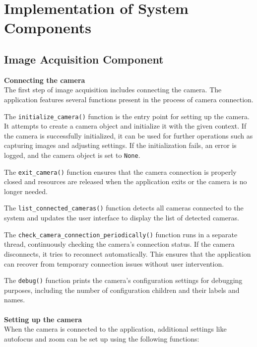 \section{Implementation of System Components}

\subsection{Image Acquisition Component}
\textbf{Connecting the camera}
\\
The first step of image acquisition includes connecting the camera. The application features several functions present in the process of camera connection.

The \texttt{initialize\_camera()} function is the entry point for setting up the camera. It attempts to create a camera object and initialize it with the given context. If the camera is successfully initialized, it can be used for further operations such as capturing images and adjusting settings. If the initialization fails, an error is logged, and the camera object is set to \texttt{None}.

The \texttt{exit\_camera()} function ensures that the camera connection is properly closed and resources are released when the application exits or the camera is no longer needed.

The \texttt{list\_connected\_cameras()} function detects all cameras connected to the system and updates the user interface to display the list of detected cameras.

The \texttt{check\_camera\_connection\_periodically()} function runs in a separate thread, continuously checking the camera's connection status. If the camera disconnects, it tries to reconnect automatically. This ensures that the application can recover from temporary connection issues without user intervention.

The \texttt{debug()} function prints the camera's configuration settings for debugging purposes, including the number of configuration children and their labels and names.
\\
\\
\textbf{Setting up the camera}
\\
When the camera is connected to the application, additional settings like autofocus and zoom can be set up using the following functions:

